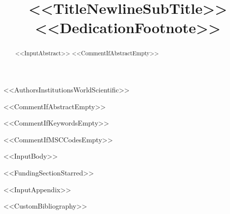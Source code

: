 \documentclass[<<DocumentClassOptions>>]{ws-m3as}
\begin{document}
\catchline{}{}{}{}{}

\title{<<TitleNewlineSubTitle>><<DedicationFootnote>>}

<<AuthorsInstitutionsWorldScientific>>

\maketitle

\begin{history}
\end{history}

<<CommentIfAbstractEmpty>>\begin{abstract}
<<InputAbstract>>
<<CommentIfAbstractEmpty>>\end{abstract}

<<CommentIfKeywordsEmpty>>

<<CommentIfMSCCodesEmpty>>

<<InputBody>>

<<FundingSectionStarred>>

\appendix
<<InputAppendix>>


<<CustomBibliography>>
\end{document}
